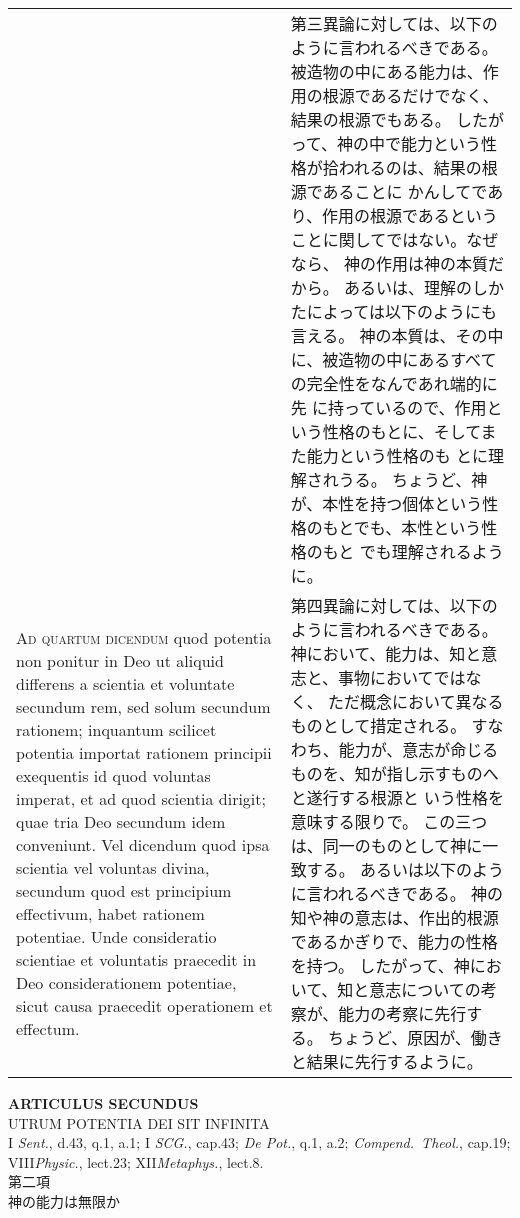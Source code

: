 \documentclass[10pt]{jsarticle} %
\begin{document}
\begin{longtable}{p{21em}p{21em}}
&

第三異論に対しては、以下のように言われるべきである。
被造物の中にある能力は、作用の根源であるだけでなく、結果の根源でもある。
したがって、神の中で能力という性格が拾われるのは、結果の根源であることに
 かんしてであり、作用の根源であるということに関してではない。なぜなら、
 神の作用は神の本質だから。
あるいは、理解のしかたによっては以下のようにも言える。
神の本質は、その中に、被造物の中にあるすべての完全性をなんであれ端的に先
 に持っているので、作用という性格のもとに、そしてまた能力という性格のも
 とに理解されうる。
ちょうど、神が、本性を持つ個体という性格のもとでも、本性という性格のもと
 でも理解されるように。


\\


{\scshape Ad quartum dicendum} quod potentia non ponitur
in Deo ut aliquid differens a scientia et voluntate secundum rem, sed
solum secundum rationem; inquantum scilicet potentia importat rationem
principii exequentis id quod voluntas imperat, et ad quod scientia
dirigit; quae tria Deo secundum idem conveniunt. Vel dicendum quod ipsa
scientia vel voluntas divina, secundum quod est principium effectivum,
habet rationem potentiae. Unde consideratio scientiae et voluntatis
praecedit in Deo considerationem potentiae, sicut causa praecedit
operationem et effectum.

&

第四異論に対しては、以下のように言われるべきである。
神において、能力は、知と意志と、事物においてではなく、
ただ概念において異なるものとして措定される。
すなわち、能力が、意志が命じるものを、知が指し示すものへと遂行する根源と
 いう性格を意味する限りで。
この三つは、同一のものとして神に一致する。
あるいは以下のように言われるべきである。
神の知や神の意志は、作出的根源であるかぎりで、能力の性格を持つ。
したがって、神において、知と意志についての考察が、能力の考察に先行する。
ちょうど、原因が、働きと結果に先行するように。

\\


\end{longtable}
\newpage



\begin{center}
 {\Large {\bf ARTICULUS SECUNDUS}}\\
 {\large UTRUM POTENTIA DEI SIT INFINITA}\\
 {\footnotesize I {\itshape Sent.}, d.43, q.1, a.1; I {\itshape SCG.}, cap.43; {\itshape De Pot.}, q.1, a.2; {\itshape Compend.~Theol.}, cap.19; VIII{\itshape Physic.}, lect.23; XII{\itshape Metaphys.}, lect.8.}\\
 {\Large 第二項\\神の能力は無限か}
\end{center}
\end{document}
